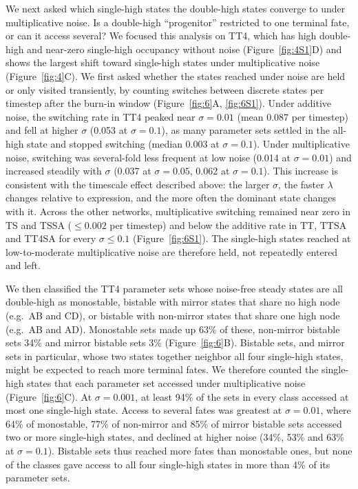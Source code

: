 \documentclass[11pt]{article}
\begin{document}
We next asked which single-high states the double-high states converge to under multiplicative noise. Is a double-high ``progenitor'' restricted to one terminal fate, or can it access several? We focused this analysis on TT4, which has high double-high and near-zero single-high occupancy without noise (Figure~\ref{fig:4S1}D) and shows the largest shift toward single-high states under multiplicative noise (Figure~\ref{fig:4}C). We first asked whether the states reached under noise are held or only visited transiently, by counting switches between discrete states per timestep after the burn-in window (Figure~\ref{fig:6}A, \ref{fig:6S1}). Under additive noise, the switching rate in TT4 peaked near $\sigma = 0.01$ (mean 0.087 per timestep) and fell at higher $\sigma$ (0.053 at $\sigma = 0.1$), as many parameter sets settled in the all-high state and stopped switching (median 0.003 at $\sigma = 0.1$). Under multiplicative noise, switching was several-fold less frequent at low noise (0.014 at $\sigma = 0.01$) and increased steadily with $\sigma$ (0.037 at $\sigma = 0.05$, 0.062 at $\sigma = 0.1$). This increase is consistent with the timescale effect described above: the larger $\sigma$, the faster $\lambda$ changes relative to expression, and the more often the dominant state changes with it. Across the other networks, multiplicative switching remained near zero in TS and TSSA ($\leq 0.002$ per timestep) and below the additive rate in TT, TTSA and TT4SA for every $\sigma \leq 0.1$ (Figure~\ref{fig:6S1}). The single-high states reached at low-to-moderate multiplicative noise are therefore held, not repeatedly entered and left.

We then classified the TT4 parameter sets whose noise-free steady states are all double-high as monostable, bistable with mirror states that share no high node (e.g.\ AB and CD), or bistable with non-mirror states that share one high node (e.g.\ AB and AD). Monostable sets made up 63\% of these, non-mirror bistable sets 34\% and mirror bistable sets 3\% (Figure~\ref{fig:6}B). Bistable sets, and mirror sets in particular, whose two states together neighbor all four single-high states, might be expected to reach more terminal fates. We therefore counted the single-high states that each parameter set accessed under multiplicative noise (Figure~\ref{fig:6}C). At $\sigma = 0.001$, at least 94\% of the sets in every class accessed at most one single-high state. Access to several fates was greatest at $\sigma = 0.01$, where 64\% of monostable, 77\% of non-mirror and 85\% of mirror bistable sets accessed two or more single-high states, and declined at higher noise (34\%, 53\% and 63\% at $\sigma = 0.1$). Bistable sets thus reached more fates than monostable ones, but none of the classes gave access to all four single-high states in more than 4\% of its parameter sets.
\end{document}
